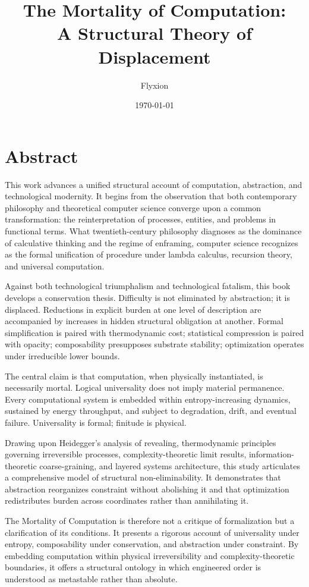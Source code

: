 \documentclass[11pt,openany]{book}
\title{The Mortality of Computation:\\
A Structural Theory of Displacement}
\author{Flyxion}
\date{\today}
\begin{document}
\maketitle

\tableofcontents

\chapter*{Abstract}

This work advances a unified structural account of computation, abstraction, and technological modernity. It begins from the observation that both contemporary philosophy and theoretical computer science converge upon a common transformation: the reinterpretation of processes, entities, and problems in functional terms. What twentieth-century philosophy diagnoses as the dominance of calculative thinking and the regime of enframing, computer science recognizes as the formal unification of procedure under lambda calculus, recursion theory, and universal computation.

Against both technological triumphalism and technological fatalism, this book develops a conservation thesis. Difficulty is not eliminated by abstraction; it is displaced. Reductions in explicit burden at one level of description are accompanied by increases in hidden structural obligation at another. Formal simplification is paired with thermodynamic cost; statistical compression is paired with opacity; composability presupposes substrate stability; optimization operates under irreducible lower bounds.

The central claim is that computation, when physically instantiated, is necessarily mortal. Logical universality does not imply material permanence. Every computational system is embedded within entropy-increasing dynamics, sustained by energy throughput, and subject to degradation, drift, and eventual failure. Universality is formal; finitude is physical.

Drawing upon Heidegger's analysis of revealing, thermodynamic principles governing irreversible processes, complexity-theoretic limit results, information-theoretic coarse-graining, and layered systems architecture, this study articulates a comprehensive model of structural non-eliminability. It demonstrates that abstraction reorganizes constraint without abolishing it and that optimization redistributes burden across coordinates rather than annihilating it.

The Mortality of Computation is therefore not a critique of formalization but a clarification of its conditions. It presents a rigorous account of universality under entropy, composability under conservation, and abstraction under constraint. By embedding computation within physical irreversibility and complexity-theoretic boundaries, it offers a structural ontology in which engineered order is understood as metastable rather than absolute.
\end{document}
